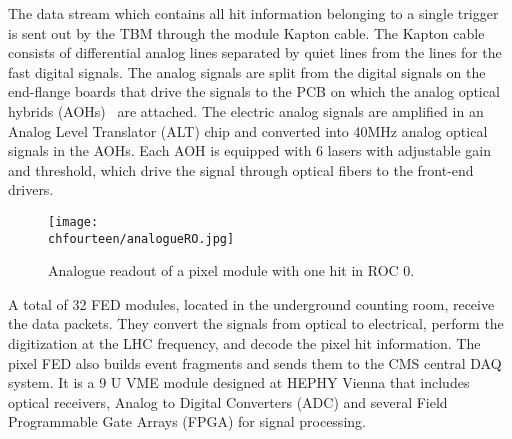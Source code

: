 The data stream which contains all hit information belonging to a single trigger is sent out by the TBM through the module Kapton cable.
The Kapton cable consists of differential analog lines separated by quiet lines from the lines for the fast digital signals.
The analog signals are split from the digital signals on the end-flange boards that drive the signals to the PCB on which the analog optical hybrids (AOHs)~\cite{1221923} are attached.
The electric analog signals are amplified in an Analog Level Translator (ALT) chip and converted into 40\unit{MHz} analog optical signals in the AOHs.
Each AOH is equipped with 6 lasers with adjustable gain and threshold, which drive the signal through optical fibers to the front-end drivers.

\begin{figure}[!htb]
 \begin{center}
 \texttt{[image: \\chfourteen/analogueRO.jpg]}
 \end{center}
 \caption{Analogue readout of a pixel module with one hit in ROC 0.}
 \label{fig:ModuleReadout}
\end{figure}

A total of 32 FED modules, located in the underground counting room, receive the data packets.
They convert the signals from optical to electrical, perform the digitization at the LHC frequency, and decode the pixel hit information.
The pixel FED also builds event fragments and sends them to the CMS central DAQ system.
It is a 9 U VME module designed at HEPHY Vienna that includes optical receivers, Analog to Digital Converters (ADC)
and several Field Programmable Gate Arrays (FPGA) for signal processing.

